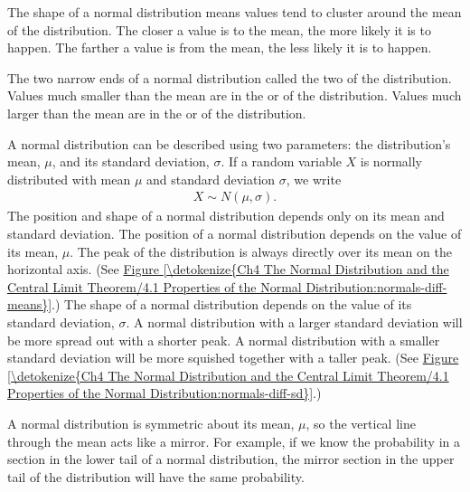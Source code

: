 \documentclass[letterpaper,10pt,english]{jupyterBook}
\begin{document}
\sphinxAtStartPar
The shape of a normal distribution means values tend to cluster around the mean of the distribution. The closer a value is to the mean, the more likely it is to happen. The farther a value is from the mean, the less likely it is to happen.

\sphinxAtStartPar
The two narrow ends of a normal distribution called the two  of the distribution. Values much smaller than the mean are in the  or  of the distribution. Values much larger than the mean are in the  or  of the distribution.

\sphinxAtStartPar
A normal distribution can be described using two parameters: the distribution’s mean, \(\mu\), and its standard deviation, \(\sigma\). If a random variable \(X\) is normally distributed with mean \(\mu\) and standard deviation \(\sigma\), we write
\begin{equation*}
\begin{split} X \sim N(\mu, \sigma). \end{split}
\end{equation*}
\sphinxAtStartPar
The position and shape of a normal distribution depends only on its mean and standard deviation. The position of a normal distribution depends on the value of its mean, \(\mu\). The peak of the distribution is always directly over its mean on the horizontal axis. (See \hyperref[\detokenize{Ch4 The Normal Distribution and the Central Limit Theorem/4.1 Properties of the Normal Distribution:normals-diff-means}]{Figure \ref{\detokenize{Ch4 The Normal Distribution and the Central Limit Theorem/4.1 Properties of the Normal Distribution:normals-diff-means}}}.) The shape of a normal distribution depends on the value of its standard deviation, \(\sigma\). A normal distribution with a larger standard deviation will be more spread out with a shorter peak. A normal distribution with a smaller standard deviation will be more squished together with a taller peak. (See \hyperref[\detokenize{Ch4 The Normal Distribution and the Central Limit Theorem/4.1 Properties of the Normal Distribution:normals-diff-sd}]{Figure \ref{\detokenize{Ch4 The Normal Distribution and the Central Limit Theorem/4.1 Properties of the Normal Distribution:normals-diff-sd}}}.)

\sphinxAtStartPar
A normal distribution is symmetric about its mean, \(\mu\), so the vertical line through the mean acts like a mirror. For example, if we know the probability in a section in the lower tail of a normal distribution, the mirror section in the upper tail of the distribution will have the same probability.
\end{document}
